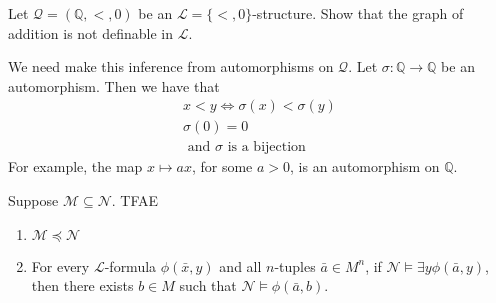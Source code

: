 \documentclass[notoc,notitlepage]{tufte-book}
\begin{document}
\begin{eg}
  Let $\mathcal{Q} = (\mathbb{Q}, <, 0)$ be an $\mathcal{L} = \{ <, 0 \}$-structure. Show that the graph of addition is not definable in $\mathcal{L}$.
\end{eg}

\begin{solution}
  We need make this inference from automorphisms on $\mathcal{Q}$. Let $\sigma : \mathbb{Q} \to \mathbb{Q}$ be an automorphism. Then we have that
  \begin{gather*}
    x < y \iff \sigma(x) < \sigma(y) \\
    \sigma(0) = 0 \\
    \text{ and } \sigma \text{ is a bijection }
  \end{gather*}
  For example, the map $x \mapsto ax$, for some $a > 0$, is an automorphism on $\mathbb{Q}$.

\end{solution}

\begin{propo}\label{propo:tarski_vaught_test}
  Suppose $\mathcal{M} \subseteq \mathcal{N}$. TFAE
  \begin{enumerate}
    \item $\mathcal{M} \preceq \mathcal{N}$
    \item For every $\mathcal{L}$-formula $\phi(\bar{x}, y)$ and all $n$-tuples $\bar{a} \in M^n$, if $\mathcal{N} \models \exists y \phi(\bar{a}, y)$, then there exists $b \in M$ such that $\mathcal{N} \models \phi(\bar{a}, b)$.
  \end{enumerate}
\end{propo}
\end{document}

